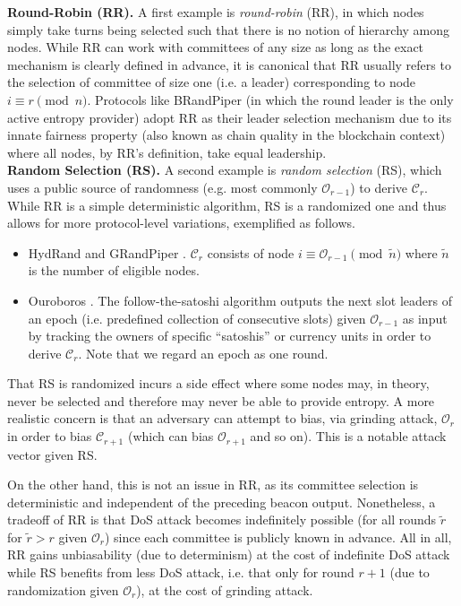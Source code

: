 \documentclass[letterpaper,twocolumn,10pt]{article}
\theoremstyle{definition}
\theoremstyle{remark}
\begin{document}
\noindent\textbf{Round-Robin (RR).} A first example is \textit{round-robin} (RR), in which nodes simply take turns being selected such that there is no notion of hierarchy among nodes. While RR can work with committees of any size as long as the exact mechanism is clearly defined in advance, it is canonical that RR usually refers to the selection of committee of size one (i.e. a leader) corresponding to node $i \equiv r \pmod n$. Protocols like BRandPiper \cite{bhat2020randpiper} (in which the round leader is the only active entropy provider) adopt RR as their leader selection mechanism due to its innate fairness property \cite{azouvi2018winning} (also known as chain quality \cite{garay2015bitcoin} in the blockchain context) where all nodes, by RR's definition, take equal leadership.\\

\noindent\textbf{Random Selection (RS).} A second example is \textit{random selection} (RS), which uses a public source of randomness (e.g. most commonly $\mathcal{O}_{r - 1}$) to derive $\mathcal{C}_r$. While RR is a simple deterministic algorithm, RS is a randomized one and thus allows for more protocol-level variations, exemplified as follows.
\begin{itemize}
\item HydRand \cite{schindler2020hydrand} and GRandPiper \cite{bhat2020randpiper}. $\mathcal{C}_r$ consists of node $i \equiv \mathcal{O}_{r - 1} \pmod{\tilde{n}}$ where $\tilde{n}$ is the number of eligible nodes.
\item Ouroboros \cite{kiayias2017ouroboros}. The follow-the-satoshi algorithm \cite{bentov2014proof,kiayias2017ouroboros} outputs the next slot leaders of an epoch (i.e. predefined collection of consecutive slots) given $\mathcal{O}_{r - 1}$ as input by tracking the owners of specific ``satoshis'' or currency units in order to derive $\mathcal{C}_r$. Note that we regard an epoch as one round.
\end{itemize}

That RS is randomized incurs a side effect where some nodes may, in theory, never be selected and therefore may never be able to provide entropy. A more realistic concern is that an adversary can attempt to bias, via grinding attack, $\mathcal{O}_r$ in order to bias $\mathcal{C}_{r + 1}$ (which can bias $\mathcal{O}_{r + 1}$ and so on). This is a notable attack vector given RS.

On the other hand, this is not an issue in RR, as its committee selection is deterministic and independent of the preceding beacon output. Nonetheless, a tradeoff of RR is that DoS attack becomes indefinitely possible (for all rounds $\tilde{r}$ for $\tilde{r} > r$ given $\mathcal{O}_r$) since each committee is publicly known in advance. All in all, RR gains unbiasability (due to determinism) at the cost of indefinite DoS attack while RS benefits from less DoS attack, i.e. that only for round $r + 1$ (due to randomization given $\mathcal{O}_r$), at the cost of grinding attack.\\
\end{document}
